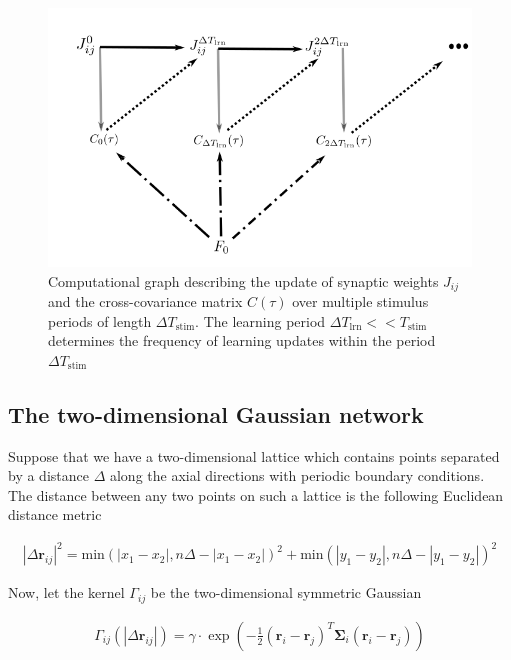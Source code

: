 \documentclass{ucetd}
\begin{document}
\begin{figure}[t!]
\centering
\includegraphics[width=150mm]{figure-6}
\caption{Computational graph describing the update of synaptic weights $J_{ij}$ and the cross-covariance matrix $C(\tau)$ over multiple stimulus periods of length $\Delta T_{\mathrm{stim}}$. The learning period $\Delta T_{\mathrm{lrn}}<< T_{\mathrm{stim}}$ determines the frequency of learning updates within the period $\Delta T_{\mathrm{stim}}$}
\end{figure}

\subsection{The two-dimensional Gaussian network}

Suppose that we have a two-dimensional lattice which contains points separated by a distance $\Delta$ along the axial directions with periodic boundary conditions. The distance between any two points on such a lattice is the following Euclidean distance metric

\begin{align*}
|\Delta\mathbf{r}_{ij}|^{2} = \mathrm{min}(|x_1 - x_2|, n\Delta - |x_1 - x_2|)^2 + \mathrm{min}(|y_1 - y_2|, n\Delta - |y_1 - y_2|)^2
\end{align*}

Now, let the kernel $\Gamma_{ij}$ be the two-dimensional symmetric Gaussian

\begin{align}
\Gamma_{ij}(|\Delta\mathbf{r}_{ij}|) = \gamma\cdot \exp\left(-\frac{1}{2}(\mathbf{r}_{i}-\mathbf{r}_{j})^{T}\mathbf{\Sigma}_{i}(\mathbf{r}_{i}-\mathbf{r}_{j})\right)
\end{align}
\end{document}
